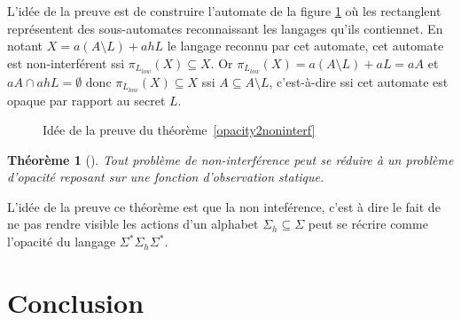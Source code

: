 \documentclass[10pt,a4paper]{article}
\newtheorem{myth}{Th\'eor\`eme}
\begin{document}
L'id\'ee de la preuve est de construire l'automate de la figure \ref{thfig} o\`u les rectanglent repr\'esentent des sous-automates reconnaissant les langages qu'ils contiennet. En notant $X=a(A\setminus L) + ahL$ le langage reconnu par cet automate, cet automate est non-interf\'erent ssi $\pi_{L_{low}}(X)\subseteq X$. Or $\pi_{L_{low}}(X)=a(A\setminus L)+aL=aA$ et $aA\cap ahL = \emptyset$ donc $\pi_{L_{low}}(X)\subseteq X$ ssi $A\subseteq A\setminus L$, c'est-\`a-dire ssi cet automate est opaque par rapport au secret $L$.

\begin{figure}[H]
  \centering
  \caption{Id\'ee de la preuve du th\'eor\`eme~\ref{opacity2noninterf}}
  \label{thfig}
\end{figure}

\begin{myth}[]
Tout probl\`eme de non-interf\'erence peut se r\'eduire \`a un probl\`eme d'opacit\'e reposant sur une fonction d'observation statique.
\end{myth}

L'id\'ee de la preuve ce th\'eor\`eme est que la non inteférence, c'est à dire le fait de ne pas rendre visible les actions d'un alphabet $\Sigma_h \subseteq \Sigma$ peut se récrire comme l'opacité du langage $\Sigma^*\Sigma_h\Sigma^*$.

\section{Conclusion}
\end{document}
